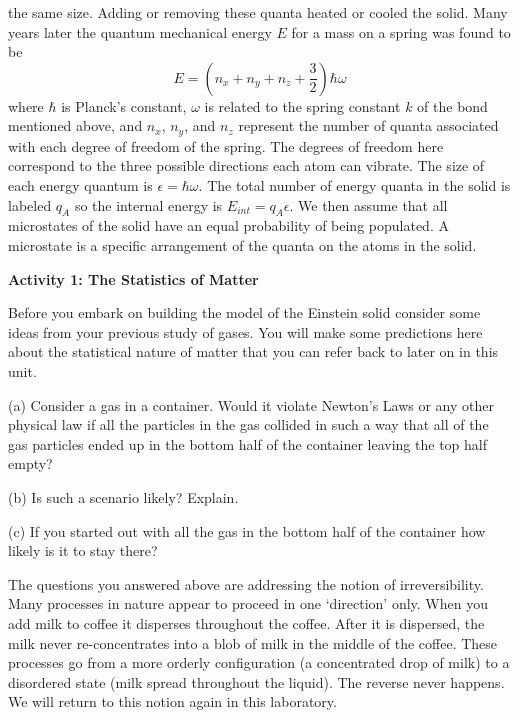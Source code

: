 the same size.
Adding or removing these quanta heated or cooled the solid.
Many years later the quantum mechanical energy $E$ for a mass on a spring was found 
to be
\begin{equation}
E = (n_x + n_y + n_z + \frac{3}{2})\hbar \omega
\end{equation}
where $\hbar$ is Planck's constant, $\omega$ is related to the spring constant $k$ of the bond
mentioned
above, and $n_x$, $n_y$, and $n_z$ represent the number of quanta associated with each
degree of freedom of the spring.
The degrees of freedom here correspond to the three possible directions each atom can vibrate.
The size of each energy quantum is $\epsilon = \hbar \omega$.
The total number of energy quanta in the solid is labeled $q_A$ so the internal energy is
$E_{int} = q_A\epsilon$.
We then assume that all microstates of the solid have an equal probability of being populated.
A microstate is a specific arrangement of the quanta on the atoms in the solid.

\textbf{Activity 1: The Statistics of Matter}

Before you embark on building the model of the Einstein solid consider some ideas from
your previous study of gases. 
You will make some predictions here about the statistical nature of matter that you can
refer back to later on in this unit.

(a) Consider a gas in a container. Would it violate Newton's Laws or any other physical law
if all the particles in the gas collided in such a way that all of the gas particles
ended up in the bottom half of the container leaving the top half empty?
\vspace{15mm}

(b) Is such a scenario likely? Explain.
\vspace{15mm}

(c) If you started out with all the gas in the bottom half of the container how likely is
it to stay there?
\vspace{15mm}

The questions you answered above are addressing the notion of irreversibility.
Many processes in nature appear to proceed in one `direction' only.
When you add milk to coffee it disperses throughout the coffee.
After it is dispersed, the milk never re-concentrates into a blob of milk in the
middle of the coffee.
These processes go from a more orderly configuration (a concentrated drop of milk)
to a disordered state (milk spread throughout the liquid).
The reverse never happens.
We will return to this notion again in this laboratory.

